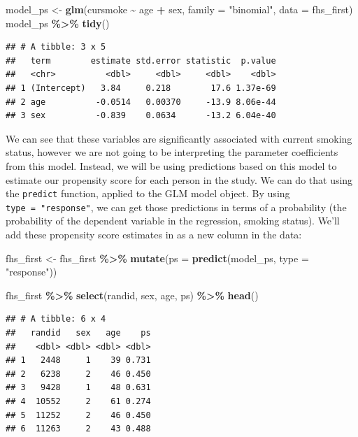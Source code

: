 \documentclass[
]{book}
\newenvironment{Shaded}{\begin{snugshade}}{\end{snugshade}}
\newcommand{\AttributeTok}[1]{\textcolor[rgb]{0.13,0.29,0.53}{#1}}
\newcommand{\FunctionTok}[1]{\textcolor[rgb]{0.13,0.29,0.53}{\textbf{#1}}}
\newcommand{\NormalTok}[1]{#1}
\newcommand{\OtherTok}[1]{\textcolor[rgb]{0.56,0.35,0.01}{#1}}
\newcommand{\SpecialCharTok}[1]{\textcolor[rgb]{0.81,0.36,0.00}{\textbf{#1}}}
\newcommand{\StringTok}[1]{\textcolor[rgb]{0.31,0.60,0.02}{#1}}
\begin{document}
\begin{Shaded}
\begin{Highlighting}[]
\NormalTok{model\_ps }\OtherTok{\textless{}{-}} \FunctionTok{glm}\NormalTok{(cursmoke }\SpecialCharTok{\textasciitilde{}}\NormalTok{ age }\SpecialCharTok{+}\NormalTok{ sex, }
                \AttributeTok{family =} \StringTok{"binomial"}\NormalTok{, }\AttributeTok{data =}\NormalTok{ fhs\_first)}
\NormalTok{model\_ps }\SpecialCharTok{\%\textgreater{}\%} 
  \FunctionTok{tidy}\NormalTok{()}
\end{Highlighting}
\end{Shaded}

\begin{verbatim}
## # A tibble: 3 x 5
##   term        estimate std.error statistic  p.value
##   <chr>          <dbl>     <dbl>     <dbl>    <dbl>
## 1 (Intercept)   3.84     0.218        17.6 1.37e-69
## 2 age          -0.0514   0.00370     -13.9 8.06e-44
## 3 sex          -0.839    0.0634      -13.2 6.04e-40
\end{verbatim}

We can see that these variables are significantly associated with current smoking status, however we are not going to be interpreting the parameter coefficients from this model. Instead, we will be using predictions based on this model to estimate our propensity score for each person in the study. We can do that using the \texttt{predict} function, applied to the GLM model object. By using \texttt{type\ =\ "response"}, we can get those predictions in terms of a probability (the probability of the dependent variable in the regression, smoking status). We'll add these propensity score estimates in as a new column in the data:

\begin{Shaded}
\begin{Highlighting}[]
\NormalTok{fhs\_first }\OtherTok{\textless{}{-}}\NormalTok{ fhs\_first }\SpecialCharTok{\%\textgreater{}\%} 
  \FunctionTok{mutate}\NormalTok{(}\AttributeTok{ps =} \FunctionTok{predict}\NormalTok{(model\_ps, }\AttributeTok{type =} \StringTok{"response"}\NormalTok{))}

\NormalTok{fhs\_first }\SpecialCharTok{\%\textgreater{}\%} 
  \FunctionTok{select}\NormalTok{(randid, sex, age, ps) }\SpecialCharTok{\%\textgreater{}\%} 
  \FunctionTok{head}\NormalTok{()}
\end{Highlighting}
\end{Shaded}

\begin{verbatim}
## # A tibble: 6 x 4
##   randid   sex   age    ps
##    <dbl> <dbl> <dbl> <dbl>
## 1   2448     1    39 0.731
## 2   6238     2    46 0.450
## 3   9428     1    48 0.631
## 4  10552     2    61 0.274
## 5  11252     2    46 0.450
## 6  11263     2    43 0.488
\end{verbatim}
\end{document}
